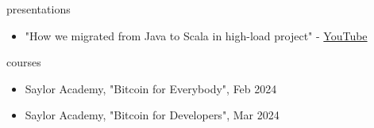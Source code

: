 \documentclass{resume}
\begin{document}
\begin{ResumeSection}{presentations}
    \begin{itemize}
        \item "How we migrated from Java to Scala in high-load project" - \href{https://www.youtube.com/watch?v=7hEcX6lynYU}{YouTube}
    \end{itemize}
\end{ResumeSection}

\bigskip

\begin{ResumeSection}{courses}
    \begin{itemize}
        \item Saylor Academy, "Bitcoin for Everybody", Feb 2024
        \item Saylor Academy, "Bitcoin for Developers", Mar 2024
    \end{itemize}
\end{ResumeSection}
\end{document}
